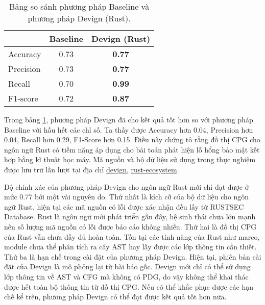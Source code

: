 \begin{table}[H]
    \centering
    \caption{Bảng so sánh phương pháp Baseline và phương pháp Devign (Rust).}
    \label{table:c5_ml}
    \begin{tabular}{l @{\hskip 3cm} c @{\hskip 3cm} c}
        \hline
         & Baseline & \textbf{Devign (Rust)} \\
        \hline
        Accuracy & 0.73 & \textbf{0.77} \\
        Precision & 0.73 & \textbf{0.77} \\
        Recall & 0.70 & \textbf{0.99} \\
        F1-score & 0.72 & \textbf{0.87} \\
        \hline
    \end{tabular}
\end{table}

Trong bảng \ref{table:c5_ml}, phương pháp Devign đã cho kết quả tốt hơn so với phương pháp Baseline với hầu hết các chỉ số.
Ta thấy được Accuracy hơn 0.04, Precision hơn 0.04, Recall hơn 0.29, F1-Score hơn 0.15.
Điều này chứng tỏ rằng đồ thị CPG cho ngôn ngữ Rust có tiềm năng áp dụng cho bài toán phát hiện lỗ hổng bảo mật kết hợp bằng kĩ thuật học máy.
Mã nguồn và bộ dữ liệu sử dụng trong thực nghiệm được lưu trữ lần lượt tại địa chỉ \href{https://github.com/congnghiahieu/devign}{devign}, \href{https://github.com/congnghiahieu/rust-ecosystem}{rust-ecosystem}.

Độ chính xác của phương pháp Devign cho ngôn ngữ Rust mới chỉ đạt được ở mức 0.77 bởi một vài nguyên do.
Thứ nhất là kích cỡ của bộ dữ liệu cho ngôn ngữ Rust, hiện tại các mã nguồn có lỗi được xác nhận đều lấy từ RUSTSEC Database.
Rust là ngôn ngữ mới phát triển gần đây, hệ sinh thái chưa lớn mạnh nên số lượng mã nguồn có lỗi được báo cáo không nhiều.
Thứ hai là đồ thị CPG của Rust vẫn chưa đầy đủ hoàn toàn.
Tồn tại các tính năng của Rust như marco, module chưa thể phân tích ra cây AST hay lấy được các lớp thông tin cần thiết.
Thứ ba là hạn chế trong cài đặt của phương pháp Devign.
Hiện tại, phiên bản cài đặt của Devign là mô phỏng lại từ bài báo gốc.
Devign mới chỉ có thể sử dụng lớp thông tin về AST và CFG mà không có PDG, do vậy không thể khai thác được hết toàn bộ thông tin từ đồ thị CPG.
Nếu có thể khắc phục được các hạn chế kể trên, phương pháp Devign có thể đạt được kết quả tốt hơn nữa.

